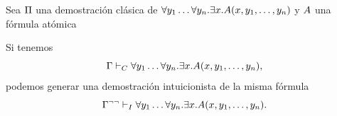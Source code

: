 \begin{theorem}
    \label{fri:thm:fri-pitwo}

    Sea $\Pi$ una demostración clásica de
    \(
    \forall y_1 \dots \forall y_n .
    \exists x .
    A(x, y_1, \dots, y_n)
    \)
    y $A$ una fórmula atómica

    Si tenemos
    \[
        \Gamma \vdash_C
        \forall y_1 \dots \forall y_n .
        \exists x .
        A(x, y_1, \dots, y_n),
    \]
    podemos generar una demostración intuicionista de la misma fórmula
    \[
        \Gamma^{\neg\neg} \vdash_I
        \forall y_1 \dots \forall y_n .
        \exists x .
        A(x, y_1, \dots, y_n).
    \]
\end{theorem}
